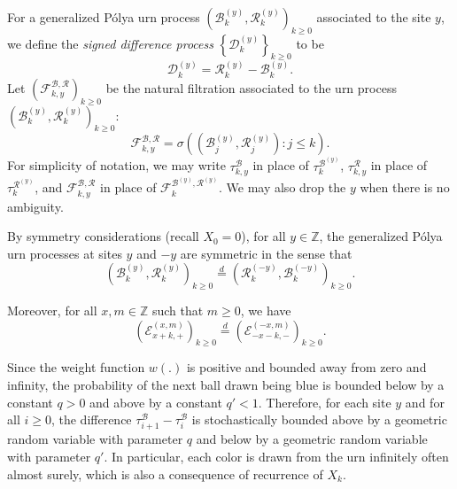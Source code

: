 \documentclass[EJP]{ejpecp} %
\begin{document}
For a generalized P\'{o}lya urn process $\left(\mathscr{B}^{(y)}_k,\mathscr{R}^{(y)}_k \right)_{k\geq 0}$ associated to the site $y$, we define the \textit{signed difference process} $\left\{\mathscr{D}^{(y)}_{k}\right\}_{k \ge 0} $ to be
\begin{equation}\label{eq:signed difference}
	\mathscr{D}^{(y)}_k  =\mathscr{R}^{(y)}_k -\mathscr{B}^{(y)}_k.  
\end{equation}
Let $\left(\mathcal{F}^{\mathscr{B},\mathscr{R}}_{k, y}\right)_{k \ge 0}$ be the natural filtration associated to the urn process $\left(\mathscr{B}^{(y)}_k,\mathscr{R}^{(y)}_k \right)_{k\geq 0}$:  
\[
\mathcal{F}^{\mathscr{B},\mathscr{R}}_{k, y} = \sigma\left( \left(\mathscr{B}_j^{(y)},\mathscr{R}_j^{(y)} \right): j\leq k \right).
\]  
For simplicity of notation, we may write $\tau_{k,y}^{\mathscr{B}}$ in place of $\tau_k^{\mathscr{B}^{(y)}}$,  $\tau_{k,y}^{\mathscr{R}}$ in place of $\tau_k^{\mathscr{R}^{(y)}}$, and $\mathcal{F}^{\mathscr{B},\mathscr{R}}_{k, y}$ in place of $\mathcal{F}^{\mathscr{B}^{(y)},\mathscr{R}^{(y)}}_{k}$. We may also drop the $y$ when there is no ambiguity.
\begin{remark}
	\label{rm:symmetry}
	By symmetry considerations (recall $X_0 = 0$), for all $y \in \mathbb{Z}$, the generalized P\'{o}lya urn processes at sites $y$ and $-y$ are symmetric in the sense that
	\[\left(\mathscr{B}^{(y)}_{k},\mathscr{R}^{(y)}_{k} \right)_{k\ge 0}
	\overset{d}{=} 
	\left(\mathscr{R}^{(-y)}_{k},\mathscr{B}^{(-y)}_{k} \right)_{k\ge 0} 
	.\]

	Moreover, for all $x, m \in \mathbb{Z}$ such that $m\geq 0$, we have
	\[
	\left(\mathcal{E}^{(x,m)}_{x+k,+} \right)_{k\geq 0} \overset{d}{=} \left(\mathcal{E}^{(-x,m)}_{-x-k,-} \right)_{k\geq 0}.
	\]
\end{remark}
\begin{remark}
	\label{rk:UrnGeo}
	Since the weight function $w(.)$ is positive and bounded away from zero and infinity, the probability of the next ball drawn being blue is bounded below by a constant $q > 0$ and above by a constant $q' < 1$. Therefore, for each site $y$ and for all $i \ge 0$, the difference $\tau_{i+1}^{\mathscr{B}} - \tau_{i}^{\mathscr{B}}$ is stochastically bounded above by a geometric random variable with parameter $q$ and below by a geometric random variable with parameter $q'$.
	In particular, each color is drawn from the urn infinitely often almost surely, which is also a consequence of recurrence of $X_k$.
\end{remark}
\end{document}

